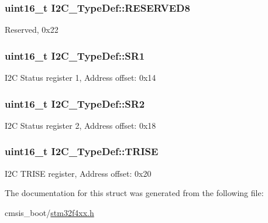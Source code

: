 \subsubsection[{\texorpdfstring{R\+E\+S\+E\+R\+V\+E\+D8}{RESERVED8}}]{\setlength{\rightskip}{0pt plus 5cm}uint16\+\_\+t I2\+C\+\_\+\+Type\+Def\+::\+R\+E\+S\+E\+R\+V\+E\+D8}\hypertarget{struct_i2_c___type_def_a6e762751c9d5a1e41efb6033a26d8ed8}{}\label{struct_i2_c___type_def_a6e762751c9d5a1e41efb6033a26d8ed8}
Reserved, 0x22 
\subsubsection[{\texorpdfstring{S\+R1}{SR1}}]{ uint16\+\_\+t I2\+C\+\_\+\+Type\+Def\+::\+S\+R1}\hypertarget{struct_i2_c___type_def_ae1602cd1c9cad449523099c97138f991}{}\label{struct_i2_c___type_def_ae1602cd1c9cad449523099c97138f991}
I2C Status register 1, Address offset\+: 0x14 
\subsubsection[{\texorpdfstring{S\+R2}{SR2}}]{ uint16\+\_\+t I2\+C\+\_\+\+Type\+Def\+::\+S\+R2}\hypertarget{struct_i2_c___type_def_a95c7f729b10eb2acafe499d9c9a81a83}{}\label{struct_i2_c___type_def_a95c7f729b10eb2acafe499d9c9a81a83}
I2C Status register 2, Address offset\+: 0x18 
\subsubsection[{\texorpdfstring{T\+R\+I\+SE}{TRISE}}]{ uint16\+\_\+t I2\+C\+\_\+\+Type\+Def\+::\+T\+R\+I\+SE}\hypertarget{struct_i2_c___type_def_aaba7a808e4dfae5cc06b197c298af206}{}\label{struct_i2_c___type_def_aaba7a808e4dfae5cc06b197c298af206}
I2C T\+R\+I\+SE register, Address offset\+: 0x20 

The documentation for this struct was generated from the following file\+:\begin{DoxyCompactItemize}
\item 
cmsis\+\_\+boot/\hyperlink{stm32f4xx_8h}{stm32f4xx.\+h}\end{DoxyCompactItemize}
